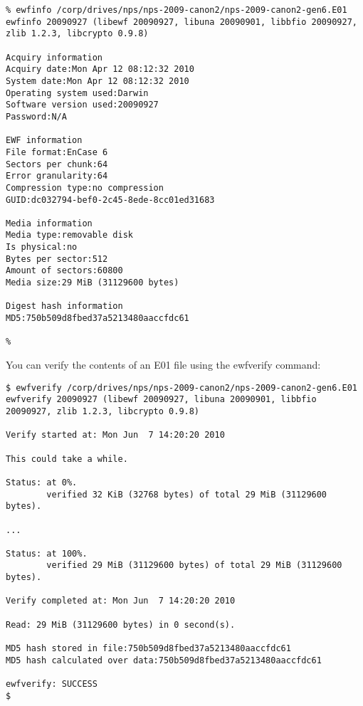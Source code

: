 \begin{Verbatim}
% ewfinfo /corp/drives/nps/nps-2009-canon2/nps-2009-canon2-gen6.E01 
ewfinfo 20090927 (libewf 20090927, libuna 20090901, libbfio 20090927, zlib 1.2.3, libcrypto 0.9.8)

Acquiry information
Acquiry date:Mon Apr 12 08:12:32 2010
System date:Mon Apr 12 08:12:32 2010
Operating system used:Darwin
Software version used:20090927
Password:N/A

EWF information
File format:EnCase 6
Sectors per chunk:64
Error granularity:64
Compression type:no compression
GUID:dc032794-bef0-2c45-8ede-8cc01ed31683

Media information
Media type:removable disk
Is physical:no
Bytes per sector:512
Amount of sectors:60800
Media size:29 MiB (31129600 bytes)

Digest hash information
MD5:750b509d8fbed37a5213480aaccfdc61

% 
\end{Verbatim}


You can verify the contents of an E01 file using the ewfverify
command:

\begin{Verbatim}
$ ewfverify /corp/drives/nps/nps-2009-canon2/nps-2009-canon2-gen6.E01 
ewfverify 20090927 (libewf 20090927, libuna 20090901, libbfio
20090927, zlib 1.2.3, libcrypto 0.9.8)

Verify started at: Mon Jun  7 14:20:20 2010

This could take a while.

Status: at 0%.
        verified 32 KiB (32768 bytes) of total 29 MiB (31129600 bytes).

...

Status: at 100%.
        verified 29 MiB (31129600 bytes) of total 29 MiB (31129600 bytes).

Verify completed at: Mon Jun  7 14:20:20 2010

Read: 29 MiB (31129600 bytes) in 0 second(s).

MD5 hash stored in file:750b509d8fbed37a5213480aaccfdc61
MD5 hash calculated over data:750b509d8fbed37a5213480aaccfdc61

ewfverify: SUCCESS
$ 
\end{Verbatim}




